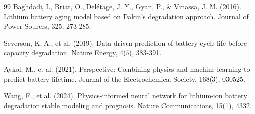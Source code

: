 \documentclass{ctexart}
\begin{document}
\begin{thebibliography}{99}
 Baghdadi, I., Briat, O., Delétage, J. Y., Gyan, P., \& Vinassa, J. M. (2016). Lithium battery aging model based on Dakin's degradation approach. Journal of Power Sources, 325, 273-285.

 Severson, K. A., et al. (2019). Data-driven prediction of battery cycle life before capacity degradation. Nature Energy, 4(5), 383-391.

 Aykol, M., et al. (2021). Perspective: Combining physics and machine learning to predict battery lifetime. Journal of the Electrochemical Society, 168(3), 030525.

 Wang, F., et al. (2024). Physics-informed neural network for lithium-ion battery degradation stable modeling and prognosis. Nature Communications, 15(1), 4332.
\end{thebibliography}
\end{document}
